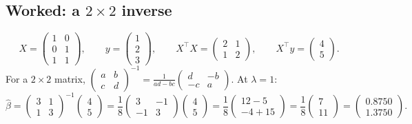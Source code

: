 \documentclass[11pt]{article}
\newcommand{\bhat}{\hat\beta}
\newcommand{\XtX}{X^{\!\top}\!X}
\newcommand{\Xty}{X^{\!\top}y}
\begin{document}
\subsection{Worked: a $2\times2$ inverse}
\label{sec:hand2}

\begin{worked}
\[
  X = \begin{pmatrix} 1 & 0\\ 0 & 1\\ 1 & 1\end{pmatrix},
  \qquad y = \begin{pmatrix}1\\2\\3\end{pmatrix},
  \qquad
  \XtX = \begin{pmatrix} 2 & 1\\ 1 & 2\end{pmatrix},
  \qquad \Xty = \begin{pmatrix}4\\5\end{pmatrix}.
\]
For a $2\times2$ matrix,
$\begin{pmatrix}a&b\\c&d\end{pmatrix}^{-1}
= \frac{1}{ad-bc}\begin{pmatrix}d&-b\\-c&a\end{pmatrix}$. At $\lambda = 1$:
\[
  \bhat = \begin{pmatrix}3&1\\1&3\end{pmatrix}^{-1}\begin{pmatrix}4\\5\end{pmatrix}
  = \frac{1}{8}\begin{pmatrix}3&-1\\-1&3\end{pmatrix}\begin{pmatrix}4\\5\end{pmatrix}
  = \frac{1}{8}\begin{pmatrix}12-5\\-4+15\end{pmatrix}
  = \frac{1}{8}\begin{pmatrix}7\\11\end{pmatrix}
  = \begin{pmatrix}0.8750\\1.3750\end{pmatrix}.
\]
\end{worked}
\end{document}
